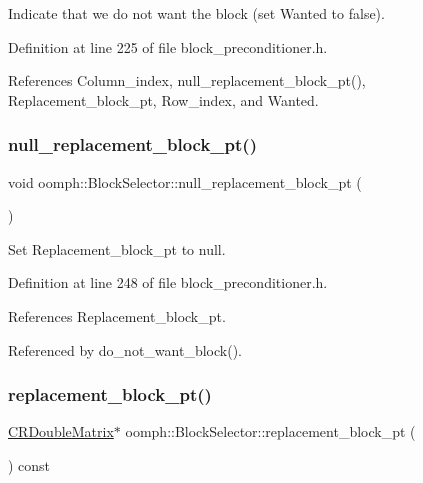 Indicate that we do not want the block (set Wanted to false). 



Definition at line 225 of file block\+\_\+preconditioner.\+h.



References Column\+\_\+index, null\+\_\+replacement\+\_\+block\+\_\+pt(), Replacement\+\_\+block\+\_\+pt, Row\+\_\+index, and Wanted.

\mbox{\label{classoomph_1_1BlockSelector_a0a9a7dd11c0dba9272d83bfc8b694482}} 
\subsubsection{\texorpdfstring{null\+\_\+replacement\+\_\+block\+\_\+pt()}{null\_replacement\_block\_pt()}}
{\footnotesize\ttfamily void oomph\+::\+Block\+Selector\+::null\+\_\+replacement\+\_\+block\+\_\+pt (\begin{DoxyParamCaption}{ }\end{DoxyParamCaption})\hspace{0.3cm}{\ttfamily [inline]}}



Set Replacement\+\_\+block\+\_\+pt to null. 



Definition at line 248 of file block\+\_\+preconditioner.\+h.



References Replacement\+\_\+block\+\_\+pt.



Referenced by do\+\_\+not\+\_\+want\+\_\+block().

\mbox{\label{classoomph_1_1BlockSelector_ad40b427ae3228721a702f5bf82b2b829}} 
\subsubsection{\texorpdfstring{replacement\+\_\+block\+\_\+pt()}{replacement\_block\_pt()}}
{\footnotesize\ttfamily \hyperlink{classoomph_1_1CRDoubleMatrix}{C\+R\+Double\+Matrix}$\ast$ oomph\+::\+Block\+Selector\+::replacement\+\_\+block\+\_\+pt (\begin{DoxyParamCaption}{ }\end{DoxyParamCaption}) const\hspace{0.3cm}{\ttfamily [inline]}}



